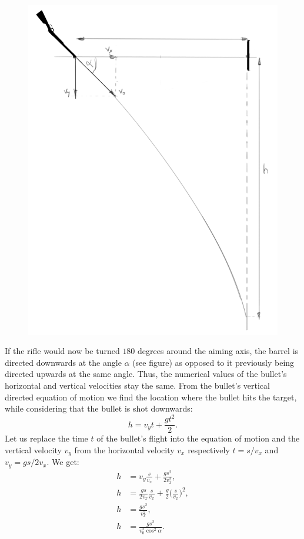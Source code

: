 \begin{figure}
	\vspace{-20pt}
	\includegraphics[width = \linewidth]{2016-v2g-06-Lasketiir-2.PNG}
\end{figure}
If the rifle would now be turned $180$ degrees around the aiming axis, the barrel is directed downwards at the angle $\alpha$ (see figure) as opposed to it previously being directed upwards at the same angle. Thus, the numerical values of the bullet’s horizontal and vertical velocities stay the same. From the bullet’s vertical directed equation of motion we find the location where the bullet hits the target, while considering that the bullet is shot downwards:
$$
h=v_{y}t+\frac{gt^2}{2}.
$$ 
Let us replace the time $t$ of the bullet’s flight into the equation of motion and the vertical velocity $v_y$ from the horizontal velocity $v_x$ respectively $t=s / v_x$ and $v_y = gs/2v_x$. We get:
\begin{align*}
h & = v_{y}\frac{s}{v_{x}}+\frac{gs^2}{2v_{x}^2},\\
h & = \frac{gs}{2v_x}\frac{s}{v_{x}}+\frac{g}{2}\Big(\frac{s}{v_{x}}\Big)^2,\\
h & = \frac{gs^2}{v_{x}^2},\\
h & = \frac{gs^2}{v_{0}^2\cos^2\alpha}.
\end{align*} 

